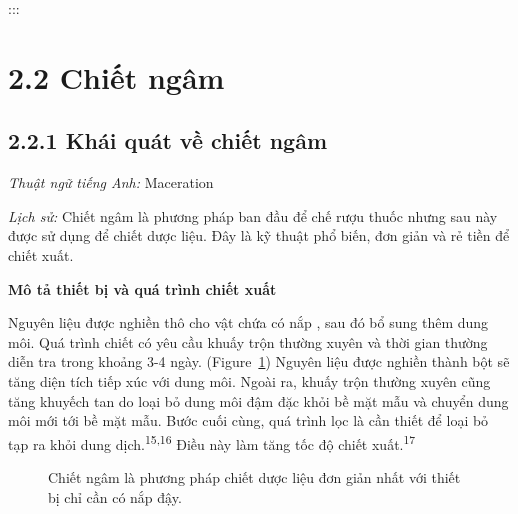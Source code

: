 \documentclass[
  twocolumn,
  landscape]{report}
\begin{document}
:::

\section{2.2 Chiết ngâm}\label{chiux1ebft-nguxe2m}

\subsection{2.2.1 Khái quát về chiết
ngâm}\label{khuxe1i-quuxe1t-vux1ec1-chiux1ebft-nguxe2m}

\emph{Thuật ngữ tiếng Anh:} Maceration

\emph{Lịch sử:} Chiết ngâm là phương pháp ban đầu để chế rượu thuốc
nhưng sau này được sử dụng để chiết dược liệu. Đây là kỹ thuật phổ biến,
đơn giản và rẻ tiền để chiết xuất.

\textbf{Mô tả thiết bị và quá trình chiết xuất}

Nguyên liệu được nghiền thô cho vật chứa có nắp , sau đó bổ sung thêm
dung môi. Quá trình chiết có yêu cầu khuấy trộn thường xuyên và thời
gian thường diễn tra trong khoảng 3-4 ngày.
(Figure~\ref{fig-LaMaceration}) Nguyên liệu được nghiền thành bột sẽ
tăng diện tích tiếp xúc với dung môi. Ngoài ra, khuấy trộn thường xuyên
cũng tăng khuyếch tan do loại bỏ dung môi đậm đặc khỏi bề mặt mẫu và
chuyển dung môi mới tới bề mặt mẫu. Bước cuối cùng, quá trình lọc là cần
thiết để loại bỏ tạp ra khỏi dung dịch.\textsuperscript{15,16} Điều này
làm tăng tốc độ chiết xuất.\textsuperscript{17}

\begin{figure}


\caption{\label{fig-LaMaceration}Chiết ngâm là phương pháp chiết dược
liệu đơn giản nhất với thiết bị chỉ cần có nắp đậy.}

\end{figure}%
\end{document}
